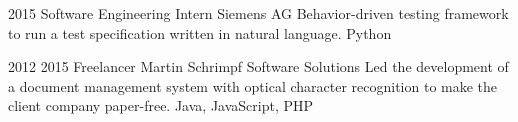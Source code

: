 {\block%
{%
2015%
}{%
}{%
Software Engineering Intern
}{%
Siemens AG
}{%
Behavior-driven testing framework to run a test specification written in natural language.%
}{%
Python
}

\block%
{%
2012 %
}{%
2015%
}{%
Freelancer
}{%
Martin Schrimpf Software Solutions
}{%
Led the development of a document %
management system with optical character recognition to make the client company paper-free.
}{%
Java, JavaScript, PHP
}

}



\newcommand{\publications}{%

\publication{2022}{GeigerSchrimpf2022Wiring}

\publication{2021}{Schrimpf2021language}

\publication{2021}{Casper2021frivolous}

\publication{2020}{gan2021threedworld}

\publication{2020}{Zhuang2020}

\publication{2020}{DapelloMarques2020}

\publication{2020}{Schrimpf2020Neuron}

\publication{2019}{KubiliusSchrimpf2019}

\publication{2018}{bashivan2018continual}

\publication{2018}{schrimpf2018}

\publication{2018}{TangSchrimpfLotter2018}

}


